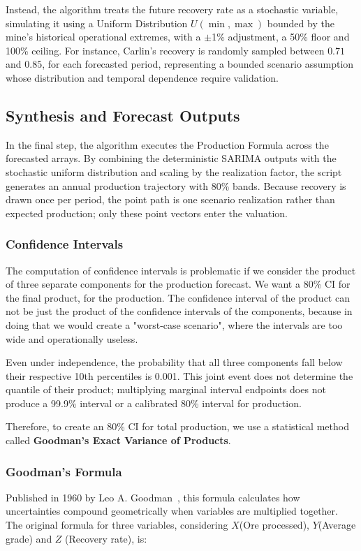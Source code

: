 Instead, the algorithm treats the future recovery rate as a stochastic variable, simulating it using a Uniform Distribution $U(\min, \max)$ bounded by the mine's historical operational extremes, with a $\pm$1\% adjustment, a 50\% floor and 100\% ceiling. For instance, Carlin's recovery is randomly sampled between $0.71$ and $0.85$, for each forecasted period, representing a bounded scenario assumption whose distribution and temporal dependence require validation.
\subsection{Synthesis and Forecast Outputs}
In the final step, the algorithm executes the Production Formula across the forecasted arrays. By combining the deterministic SARIMA outputs with the stochastic uniform distribution and scaling by the realization factor, the script generates an annual production trajectory with 80\% bands. Because recovery is drawn once per period, the point path is one scenario realization rather than expected production; only these point vectors enter the valuation.
\subsubsection{Confidence Intervals}
The computation of confidence intervals is problematic if we consider the product of three separate components for the production forecast. We want a 80\% CI for the final product, for the production.
The confidence interval of the product can not be just the product of the confidence intervals of the components, because in doing that we would create a "worst-case scenario", where the intervals are too wide and operationally useless.

Even under independence, the probability that all three components fall below their respective 10th percentiles is 0.001. This joint event does not determine the quantile of their product; multiplying marginal interval endpoints does not produce a 99.9\% interval or a calibrated 80\% interval for production.

Therefore, to create an 80\% CI for total production, we use a statistical method called \textbf{Goodman's Exact Variance of Products}.
\subsubsection{Goodman's Formula}
Published in 1960 by Leo A. Goodman~\cite{Goodman1960}, this formula calculates how uncertainties compound geometrically when variables are multiplied together. The original formula for three variables, considering $X$(Ore processed), $Y$(Average grade) and $Z$ (Recovery rate), is:

